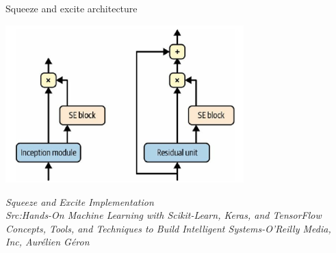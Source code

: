 \begin{frame}{Squeeze and excite architecture}
	\begin{center}
		\includegraphics[width=0.69\textwidth]{images/SE implementations.png}%
	\end{center}
	\tiny{\textit{Squeeze and Excite Implementation\\ Src:Hands-On Machine Learning with Scikit-Learn, Keras, and TensorFlow  Concepts, Tools, and Techniques to Build Intelligent Systems-O'Reilly Media, Inc, Aurélien Géron  }}
\end{frame}

